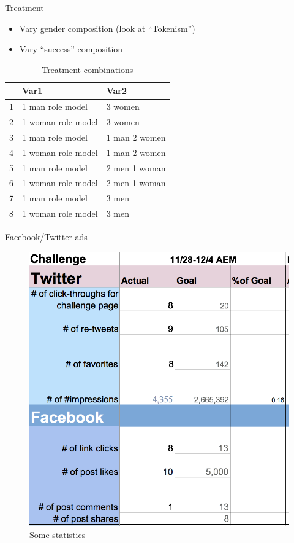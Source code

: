 \begin{frame}{Treatment}

\begin{itemize}
\tightlist
\item
  Vary gender composition (look at ``Tokenism'')
\item
  Vary ``success'' composition
\end{itemize}

\begin{table}[ht]
\centering
\begin{tabular}{rll}
  \hline
 & Var1 & Var2 \\ 
  \hline
1 & 1 man role model & 3 women \\ 
  2 & 1 woman role model & 3 women \\ 
  3 & 1 man role model & 1 man 2 women \\ 
  4 & 1 woman role model & 1 man 2 women \\ 
  5 & 1 man role model & 2 men 1 woman \\ 
  6 & 1 woman role model & 2 men 1 woman \\ 
  7 & 1 man role model & 3 men \\ 
  8 & 1 woman role model & 3 men \\ 
   \hline
\end{tabular}
\caption{Treatment combinations} 
\end{table}

\end{frame}

\begin{frame}{Facebook/Twitter ads}

\begin{figure}
\centering
\includegraphics{ads.png}
\caption{Some statistics}
\end{figure}

\end{frame}

